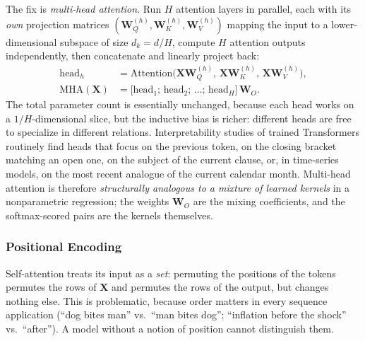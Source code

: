 \documentclass[11pt,a4paper]{report}
\newcommand{\W}{\bm{W}}
\newcommand{\X}{\bm{X}}
\begin{document}
The fix is \emph{multi-head attention}.  Run $H$ attention layers in parallel, each with its \emph{own} projection matrices $(\W_Q^{(h)}, \W_K^{(h)}, \W_V^{(h)})$ mapping the input to a lower-dimensional subspace of size $d_k = d/H$, compute $H$ attention outputs independently, then concatenate and linearly project back:
\begin{align}
\mathrm{head}_h
&= \mathrm{Attention}\bigl(\X\W_Q^{(h)},\, \X\W_K^{(h)},\, \X\W_V^{(h)}\bigr), \\
\mathrm{MHA}(\X)
&= \big[\mathrm{head}_1; \,\mathrm{head}_2; \,\ldots;\,\mathrm{head}_H\big]\,\W_O .
\end{align}
The total parameter count is essentially unchanged, because each head works on a $1/H$-dimensional slice, but the inductive bias is richer: different heads are free to specialize in different relations.  Interpretability studies of trained Transformers routinely find heads that focus on the previous token, on the closing bracket matching an open one, on the subject of the current clause, or, in time-series models, on the most recent analogue of the current calendar month.  Multi-head attention is therefore \emph{structurally analogous to a mixture of learned kernels} in a nonparametric regression; the weights $\W_O$ are the mixing coefficients, and the softmax-scored pairs are the kernels themselves.

\subsubsection{Positional Encoding}
\label{sec:pos_enc}

Self-attention treats its input as a \emph{set}: permuting the positions of the tokens permutes the rows of $\X$ and permutes the rows of the output, but changes nothing else.  This is problematic, because order matters in every sequence application (``dog bites man'' vs.\ ``man bites dog''; ``inflation before the shock'' vs.\ ``after'').  A model without a notion of position cannot distinguish them.
\end{document}
